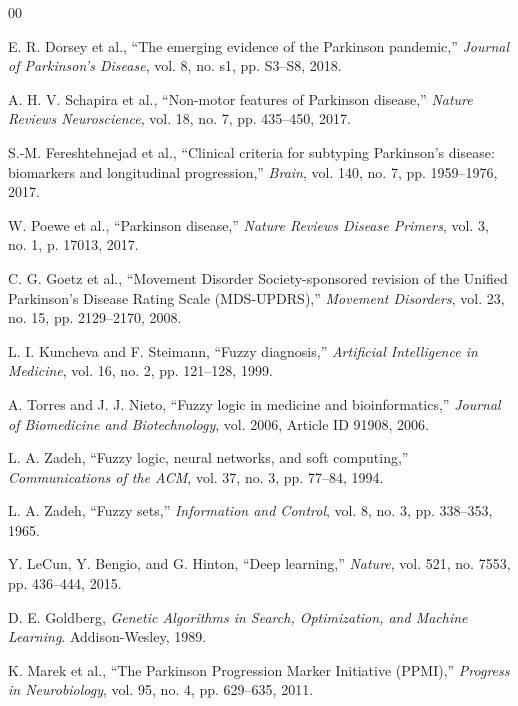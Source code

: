 \documentclass[journal,twoside,web]{ieeecolor}
\begin{document}
\begin{thebibliography}{00}

E. R. Dorsey et al., ``The emerging evidence of the Parkinson pandemic,'' \textit{Journal of Parkinson's Disease}, vol. 8, no. s1, pp. S3--S8, 2018.

A. H. V. Schapira et al., ``Non-motor features of Parkinson disease,'' \textit{Nature Reviews Neuroscience}, vol. 18, no. 7, pp. 435--450, 2017.

S.-M. Fereshtehnejad et al., ``Clinical criteria for subtyping Parkinson's disease: biomarkers and longitudinal progression,'' \textit{Brain}, vol. 140, no. 7, pp. 1959--1976, 2017.

W. Poewe et al., ``Parkinson disease,'' \textit{Nature Reviews Disease Primers}, vol. 3, no. 1, p. 17013, 2017.

C. G. Goetz et al., ``Movement Disorder Society-sponsored revision of the Unified Parkinson's Disease Rating Scale (MDS-UPDRS),'' \textit{Movement Disorders}, vol. 23, no. 15, pp. 2129--2170, 2008.

L. I. Kuncheva and F. Steimann, ``Fuzzy diagnosis,'' \textit{Artificial Intelligence in Medicine}, vol. 16, no. 2, pp. 121--128, 1999.

A. Torres and J. J. Nieto, ``Fuzzy logic in medicine and bioinformatics,'' \textit{Journal of Biomedicine and Biotechnology}, vol. 2006, Article ID 91908, 2006.

L. A. Zadeh, ``Fuzzy logic, neural networks, and soft computing,'' \textit{Communications of the ACM}, vol. 37, no. 3, pp. 77--84, 1994.

L. A. Zadeh, ``Fuzzy sets,'' \textit{Information and Control}, vol. 8, no. 3, pp. 338--353, 1965.

Y. LeCun, Y. Bengio, and G. Hinton, ``Deep learning,'' \textit{Nature}, vol. 521, no. 7553, pp. 436--444, 2015.

D. E. Goldberg, \textit{Genetic Algorithms in Search, Optimization, and Machine Learning}. Addison-Wesley, 1989.

K. Marek et al., ``The Parkinson Progression Marker Initiative (PPMI),'' \textit{Progress in Neurobiology}, vol. 95, no. 4, pp. 629--635, 2011.


\end{thebibliography}
\end{document}
